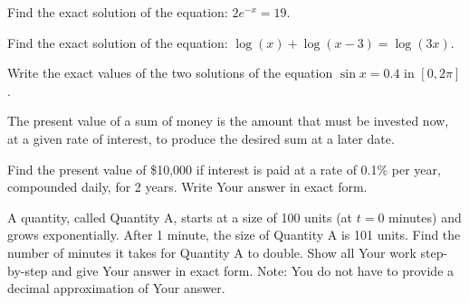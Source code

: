 \documentclass[11pt,answers]{exam}
\begin{document}
\begin{questions}

\newpage
 			

\question[2] Find the exact solution of the equation: $\displaystyle 2e^{-x}=19$.

\fillwithdottedlines{1.5cm}

\question[2] Find the exact solution of the equation: $\displaystyle \log(x) + \log(x - 3) = \log(3x)$.

\fillwithdottedlines{2cm}

 \question[2] Write the exact values of the two solutions of the equation $\displaystyle \sin x = 0.4$ in $[0,2\pi]$.
 
 \fillwithdottedlines{1.5cm}
 
 \question[2] The present value of a sum of money is the amount that must be invested now, at a given rate of interest, to produce the desired sum at a later date. 
 
 Find the present value of \$10,000 if interest is paid at a rate of 0.1\% per year, compounded daily, for 2 years. Write Your answer in exact form.
 
 \fillwithdottedlines{2cm}
 
 \question[2] A quantity, called Quantity A, starts at a size of 100 units (at $t=0$ minutes) and grows exponentially. After 1 minute, the size of Quantity A is 101 units. Find the number of minutes it takes for Quantity A to double.    Show all Your work step-by-step and give Your answer in exact form. Note: You do not have to provide a decimal approximation of Your answer.
 

\end{questions}
\end{document}
